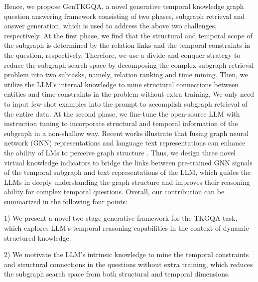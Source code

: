 \documentclass[11pt]{article}
\begin{document}
Hence, we propose GenTKGQA, a novel generative temporal knowledge graph question answering framework consisting of two phases, subgraph retrieval and answer generation, which is used to address the above two challenges, respectively.
At the first phase, we find that the structural and temporal scope of the subgraph is determined by the relation links and the temporal constraints in the question, respectively.
Therefore, we use a divide-and-conquer strategy to reduce the subgraph search space by decomposing the complex subgraph retrieval problem into two subtasks, namely, relation ranking and time mining.
Then, we utilize the LLM's internal knowledge to mine structural connections between entities and time constraints in the problem without extra training.
We only need to input few-shot examples into the prompt to accomplish subgraph retrieval of the entire data.
At the second phase, we fine-tune the open-source LLM with instruction tuning to incorporate structural and temporal information of the subgraph in a non-shallow way.
Recent works illustrate that fusing graph neural network (GNN) representations and language text representations can enhance the ability of LMs to perceive graph structure \cite{GREASELM}.
Thus, we design three novel virtual knowledge indicators to bridge the links between pre-trained GNN signals of the temporal subgraph and text representations of the LLM, which guides the LLMs in deeply understanding the graph structure and improves their reasoning ability for complex temporal questions.
Overall, our contribution can be summarized in the following four points:

1) We present a novel two-stage generative framework for the TKGQA task, which explores LLM's temporal reasoning capabilities in the context of dynamic structured knowledge.

2) We motivate the LLM's intrinsic knowledge to mine the temporal constraints and structural connections in the questions without extra training, which reduces the subgraph search space from both structural and temporal dimensions. 
\end{document}
